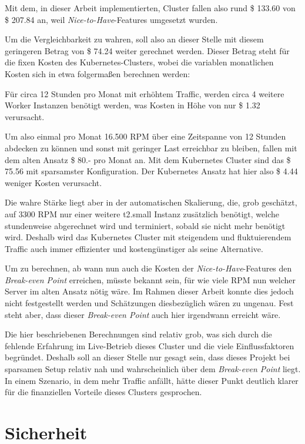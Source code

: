 Mit dem, in dieser Arbeit implementierten, Cluster fallen also rund
\$ 133.60 von \$ 207.84 an, weil \emph{Nice-to-Have}-Features umgesetzt wurden.

Um die Vergleichbarkeit zu wahren, soll also an dieser Stelle mit diesem
geringeren Betrag von \$ 74.24 weiter gerechnet werden.
Dieser Betrag steht für die fixen Kosten des Kubernetes-Clusters, wobei
die variablen monatlichen Kosten sich in etwa folgermaßen berechnen werden:

F\"ur circa 12 Stunden pro Monat mit erhöhtem Traffic,
werden circa 4 weitere Worker Instanzen benötigt werden, was Kosten
in Höhe von nur \$ 1.32 verursacht.

Um also einmal pro Monat 16.500 RPM über eine Zeitspanne von 12 Stunden
abdecken zu können und sonst mit geringer Last erreichbar zu bleiben, fallen
mit dem alten Ansatz \$ 80.- pro Monat an.
Mit dem Kubernetes Cluster sind das \$ 75.56 mit sparsamster Konfiguration.
Der Kubernetes Ansatz hat hier also \$ 4.44 weniger Kosten verursacht.

Die wahre Stärke liegt aber in der automatischen Skalierung, die, grob
geschätzt, auf 3300 RPM nur einer weitere t2.small Instanz zusätzlich
benötigt, welche stundenweise abgerechnet wird und
terminiert, sobald sie nicht
mehr benötigt wird. Deshalb wird das Kubernetes Cluster mit steigendem und
fluktuierendem Traffic auch immer effizienter und kostengünstiger als seine
Alternative.

Um zu berechnen, ab wann nun auch die Kosten der \emph{Nice-to-Have}-Features
den \emph{Break-even Point} erreichen, müsste bekannt sein, für
wie viele RPM nun welcher Server im alten Ansatz nötig wäre.
Im Rahmen dieser
Arbeit konnte dies jedoch nicht festgestellt
werden und Schätzungen diesbezüglich wären zu
ungenau. Fest steht aber, dass dieser \emph{Break-even Point} auch hier
irgendwann erreicht wäre.

Die hier beschriebenen Berechnungen sind relativ grob, was sich durch
die fehlende Erfahrung im Live-Betrieb dieses Cluster und die viele
Einflussfaktoren begr\"undet.
Deshalb soll an dieser Stelle nur
gesagt sein, dass dieses Projekt bei sparsamen Setup relativ nah und
wahrscheinlich über dem \emph{Break-even Point} liegt.
In einem Szenario, in dem mehr Traffic anfällt, hätte dieser Punkt deutlich
klarer für die finanziellen Vorteile dieses Clusters gesprochen.

\section{Sicherheit}


